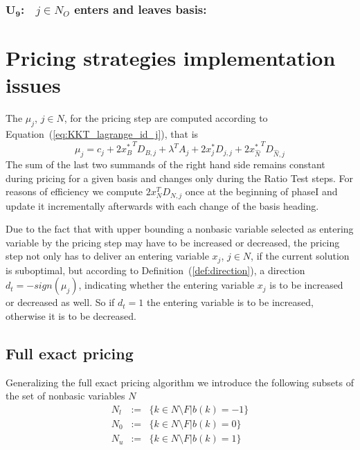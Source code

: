 \documentclass[a4paper]{article}
\begin{document}
\subsubsection{$\mathbf{U_{9}}$:$\quad j \in N_{O}$ enters and leaves basis:}

\section{Pricing strategies implementation issues}
The $\mu_{j}$, $j \in N$, for the pricing step are computed according to
Equation~(\ref{eq:KKT_lagrange_id_j}),
that is
\begin{equation}
\mu_{j}=
  c_{j} + 2{x_{B}^{*}}^{T}D_{B,j}
  +\lambda^{T} A_{j}
  + 2x_{j}^{*}D_{j,j}
  + 2{x_{\hat{N}}^{*}}^{T}D_{\hat{N},j}
\end{equation}
The sum of the last two summands of the right hand side remains constant
during pricing for a given basis and changes only during the Ratio Test steps.
For reasons of efficiency we compute $2x_{N}^{T}D_{N,j}$ once at the
beginning of phaseI and update it incrementally afterwards with each change
of the basis heading.

Due to the fact that with upper bounding a nonbasic variable selected 
as entering variable by the 
pricing step may have to be increased or decreased, 
the pricing step not
only has to deliver an entering variable $x_{j}$, $j \in N$, if the current
solution is suboptimal, but according to Definition~(\ref{def:direction}), a
direction $d_{t}=-sign(\mu_{j})$, indicating whether the entering variable
$x_{j}$ is to be increased or decreased as well. So if $d_{t}=1$ the entering
variable is to be increased, otherwise it is to be decreased.

\subsection{Full exact pricing}
Generalizing the full exact pricing algorithm we introduce the following subsets of the set of nonbasic variables $N$
\begin{eqnarray}
N_{l}&:=&\{k \in N \setminus F\left|\right. b\left(k\right)=-1\} \\
N_{0}&:=&\{k \in N \setminus F\left|\right. b\left(k\right)=0\} \\
N_{u}&:=&\{k \in N \setminus F\left|\right. b\left(k\right)=1\}
\end{eqnarray}
\end{document}
